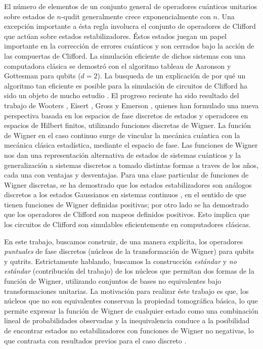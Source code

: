 \documentclass[a4paper]{report}
\begin{document}
  El número de elementos de un conjunto general de
  operadores cuánticos unitarios sobre estados de $n$-qudit
  generalmente crece exponencialmente con $n$. Una excepción
  importante a ésta regla involucra el conjunto de
  operadores de Clifford que actúan sobre estados
  estabilizadores. Éstos estados juegan un papel importante
  en la corrección de errores cuánticos \cite{gottesman1998}
  y son cerrados bajo la acción de las compuertas de
  Clifford. La simulación eficiente de dichos sistemas con
  una computadora clásica se demostró con el algoritmo
  tableau de Aaronson y Gottesman \cite{ aaronson2004,
  gottesman1998} para qubits ($d=2$). La busqueda de un
  explicación de por qué un algoritmo tan eficiente es
  posible para la simulación de circuitos de Clifford ha
  sido un objeto de mucho estudio \cite{gottesman1999,
  howard2014, mari2012}. El progreso reciente ha sido
  resultado del trabajo de Wooters \cite{wootters1987},
  Eisert \cite{mari2012}, Gross \cite{gross2006} y Emerson
  \cite{howard2014}, quienes han formulado una nueva
  perspectiva basada en los espacios de fase discretos de
  estados y operadores en espacios de Hilbert finitos,
  utilizando funciones discretas de Wigner.  La función de
  Wigner en el caso continuo surge de vincular la mecánica
  cuántica con la mecánica clásica estadística, mediante el
  espacio de fase. Las funciones de Wigner nos dan una
  representación alternativa de estados de sistemas
  cuánticos y la generalización a sistemas discretos a
  tomado distintas formas a traves de los años, cada una con
  ventajas y desventajas. Para una clase particular de
  funciones de Wigner discretas, se ha demostrado que los
  estados estabilizadores son análogos discretos a los
  estados Gaussianos en sistemas continuos \cite{gross2006},
  en el sentido de que tienen funciones de Wigner definidas
  positivas; por otro lado se ha demostrado que los
  operadores de Clifford son mapeos definidos positivos.
  Esto implica que los circuitos de Clifford son simulables
  eficientemente en computadores clásicas.

  En este trabajo, buscamos construir, de una manera
  explícita, los operadores \textit{puntuales} de fase
  discretos (núcleos de la transformación de Wigner) para
  qubits y qutrits. Estrictamente hablando, buscamos la
  construcción \textit{estándar} \cite{wootters1987} y
  \textit{no estándar} (contribución del trabajo) de los
  núcleos que permitan dos formas de la función de Wigner,
  utilizando conjuntos de bases no equivalentes bajo
  transformaciones unitarias. La motivación para realizar
  éste trabajo es que, los núcleos que no son equivalentes
  conservan la propiedad tomográfica básica, lo que permite
  expresar la función de Wigner de cualquier estado como una
  combinación lineal de probabilidades observadas y la
  inequivalencia conduce a la posibilidad de encontrar
  estados no estabilizadores con funciones de Wigner no
  negativas, lo que contrasta con resultados previos para el
  caso discreto \cite{gross2006, galvao2005, cormick2006a}.
\end{document}
